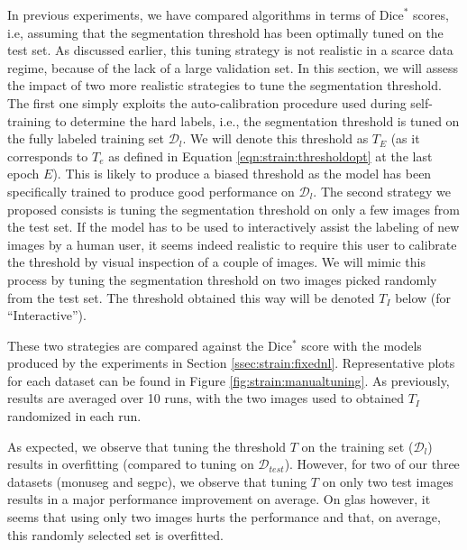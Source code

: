 In previous experiments, we have compared algorithms in terms of $\text{Dice}^*$ scores, i.e, assuming that the segmentation threshold has been optimally tuned on the test set. As discussed earlier, this tuning strategy is not realistic in a scarce data regime, because of the lack of a large validation set. In this section, we will assess the impact of two more realistic strategies to tune the segmentation threshold. The first one simply exploits the auto-calibration procedure used during self-training to determine the hard labels, i.e., the segmentation threshold is tuned on the fully labeled training set $\mathcal{D}_l$. We will denote this threshold as $T_E$ (as it corresponds to $T_e$ as defined in Equation \ref{eqn:strain:thresholdopt} at the last epoch $E$). This is likely to produce a biased threshold as the model has been specifically trained to produce good performance on $\mathcal{D}_l$. The second strategy we proposed consists is tuning the segmentation threshold on only a few images from the test set. If the model has to be used to interactively assist the labeling of new images by a human user, it seems indeed realistic to require this user to calibrate the threshold by visual inspection of a couple of images. We will mimic this process by tuning the segmentation threshold on two images picked randomly from the test set. The threshold obtained this way will be denoted $T_I$ below (for ``Interactive'').

These two strategies are compared against the Dice$^*$ score with the models produced by the experiments in Section \ref{ssec:strain:fixednl}. Representative plots for each dataset can be found in Figure \ref{fig:strain:manualtuning}. As previously, results are averaged over 10 runs, with the two images used to obtained $T_I$ randomized in each run.

As expected, we observe that tuning the threshold $T$ on the training set ($\mathcal{D}_l$) results in overfitting (\ie compared to tuning on $\mathcal{D}_{test}$). However, for two of our three datasets (\acrshort{monuseg} and \acrshort{segpc}), we observe that tuning $T$ on only two test images results in a major performance improvement on average. On \acrshort{glas} however, it seems that using only two images hurts the performance and that, on average, this randomly selected set is overfitted. 

